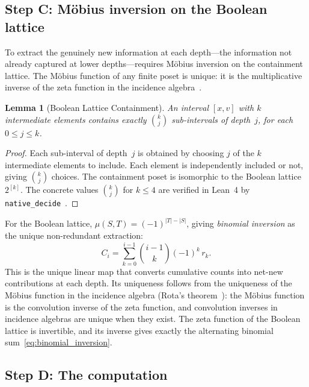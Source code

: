 \documentclass[12pt,a4paper]{article}
\newtheorem{lemma}[theorem]{Lemma}
\begin{document}
\subsection{Step C: M\"obius inversion on the Boolean lattice}\label{sec:mobius}

To extract the genuinely new information at each depth---the information not already captured at lower depths---requires M\"obius inversion on the containment lattice. The M\"obius function of any finite poset is unique: it is the multiplicative inverse of the zeta function in the incidence algebra~\cite{Rota1964}.

\begin{lemma}[Boolean Lattice Containment]\label{lem:boolean}
An interval $[x,v]$ with $k$ intermediate elements contains exactly $\binom{k}{j}$ sub-intervals of depth~$j$, for each $0 \leq j \leq k$.
\end{lemma}

\begin{proof}
Each sub-interval of depth~$j$ is obtained by choosing $j$ of the $k$ intermediate elements to include. Each element is independently included or not, giving $\binom{k}{j}$ choices. The containment poset is isomorphic to the Boolean lattice $2^{[k]}$. The concrete values $\binom{k}{j}$ for $k \leq 4$ are verified in Lean~4 by \texttt{native\_decide}~\cite{O14Lean}.
\end{proof}

For the Boolean lattice, $\mu(S,T) = (-1)^{|T|-|S|}$, giving \emph{binomial inversion} as the unique non-redundant extraction:
\begin{equation}
C_i = \sum_{k=0}^{i-1}\binom{i-1}{k}(-1)^k\,r_k.
\label{eq:binomial_inversion}
\end{equation}
This is the unique linear map that converts cumulative counts into net-new contributions at each depth. Its uniqueness follows from the uniqueness of the M\"obius function in the incidence algebra (Rota's theorem~\cite{Rota1964}): the M\"obius function is the convolution inverse of the zeta function, and convolution inverses in incidence algebras are unique when they exist. The zeta function of the Boolean lattice is invertible, and its inverse gives exactly the alternating binomial sum~\eqref{eq:binomial_inversion}.

\subsection{Step D: The computation}\label{sec:computation}
\end{document}
